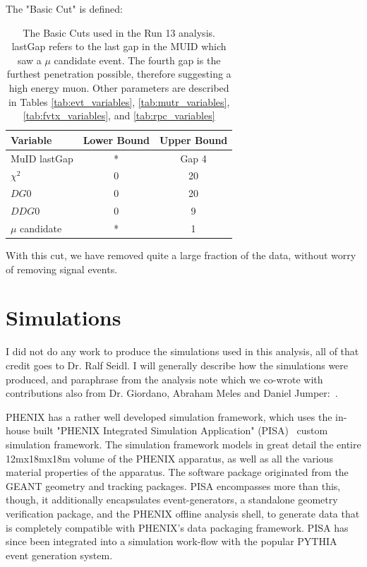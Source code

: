 The "Basic Cut" is defined:
\begin{table}[ht]
  \centering
  \begin{tabular}{l c c}
    \toprule
    \textbf{Variable} & \textbf{Lower Bound} & \textbf{Upper Bound} \\
    \midrule
    MuID lastGap & * & Gap 4 \\ 
    $\chi^2$ & 0 & 20 \\
    $DG0$ & 0 & 20 \\
    $DDG0$ & 0 & 9 \\
    $\mu$ candidate & * & 1 \\
    \bottomrule
  \end{tabular}
  \caption{ The Basic Cuts used in the Run 13 analysis. lastGap refers to the
    last gap in the MUID which saw a $\mu$ candidate event. The fourth gap is
    the furthest penetration possible, therefore suggesting a high energy muon.
    Other parameters are described in Tables \ref{tab:evt_variables}, 
    \ref{tab:mutr_variables}, \ref{tab:fvtx_variables}, and
    \ref{tab:rpc_variables}
  }
  \label{tab:basic_cut}
\end{table}

With this cut, we have removed quite a large fraction of the data, without worry
of removing signal events.

\clearpage
\section{Simulations}

I did not do any work to produce the simulations used in this analysis, all of
that credit goes to Dr. Ralf Seidl. I will generally describe how the
simulations were produced, and paraphrase from the analysis note which we
co-wrote with contributions also from Dr. Giordano, Abraham Meles and Daniel
Jumper:~\cite{Seidl2014}.

PHENIX has a rather well developed simulation framework, which uses the in-house
built "PHENIX Integrated Simulation Application" (PISA)~\cite{Macguire1997}
custom simulation framework. The simulation framework models in great detail the
entire 12mx18mx18m volume of the PHENIX apparatus, as well as all the various
material properties of the apparatus. The software package originated from the
GEANT geometry and tracking packages. PISA encompasses more than this, though,
it additionally encapsulates event-generators, a standalone geometry
verification package, and the PHENIX offline analysis shell, to generate data
that is completely compatible with PHENIX's data packaging framework. PISA has
since been integrated into a simulation work-flow with the popular PYTHIA event
generation system.

